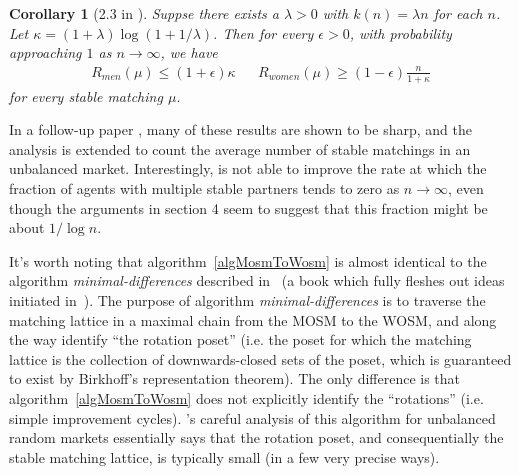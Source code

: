 \documentclass[12pt]{article}
\newtheorem{corollary}[definition]{Corollary}
\begin{document}
  \begin{corollary}[2.3 in \cite{AshlagiUnbalancedCompetition17}]
    Suppse there exists a $\lambda >0$ with $k(n) = \lambda n$ for each $n$.
    Let $\kappa = (1 + \lambda)\log(1 + 1/\lambda)$.
    Then for every $\epsilon>0$, with probability approaching $1$ as
    $n\to\infty$, we have
    \begin{align*}
      R_{men}(\mu) \le (1+\epsilon)\kappa &&
      R_{women}(\mu) \ge (1-\epsilon)\frac n {1 + \kappa}
    \end{align*}
    for every stable matching $\mu$.
  \end{corollary}

  In a follow-up paper \cite{PittelLikelyStableUnbalanced19}, many of these
  results are shown to be sharp, and the analysis is extended to count the
  average number of stable matchings in an unbalanced market.
  Interestingly, \cite{PittelLikelyStableUnbalanced19} is not able to improve
  the rate at which the fraction of agents with multiple stable partners tends
  to zero as $n\to\infty$, even though the arguments in section 4 seem to
  suggest that this fraction might be about $1/\log n$.

  It's worth noting that algorithm~\ref{algMosmToWosm} is almost identical to the
  algorithm \emph{minimal-differences} described
  in~\cite{GusfieldStableStructureAlgs89} (a book which fully fleshes out
  ideas initiated in~\cite{IrvingCountingStable86}).
  The purpose of algorithm \emph{minimal-differences} is to traverse the
  matching lattice in a maximal chain from the MOSM to the WOSM, and along the
  way identify ``the rotation poset'' (i.e. the poset for which the matching
  lattice is the collection of downwards-closed sets of the poset, which is
  guaranteed to exist by Birkhoff's representation theorem).
  The only difference is that algorithm~\ref{algMosmToWosm} does not explicitly
  identify the ``rotations'' (i.e. simple improvement cycles).
  \cite{AshlagiUnbalancedCompetition17}'s careful analysis of this algorithm
  for unbalanced random markets essentially says that the rotation poset, and
  consequentially the stable matching lattice, is typically small (in a few very
  precise ways).




{}

\end{document}
